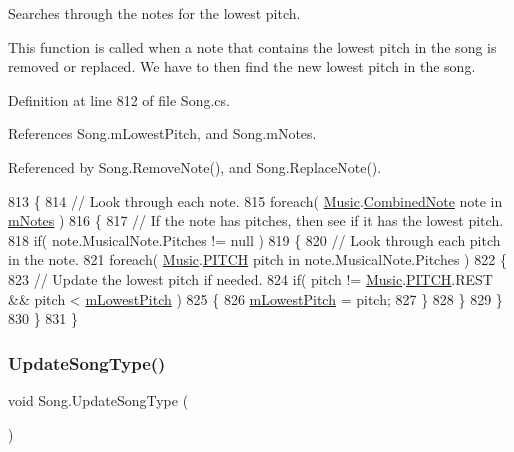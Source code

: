 Searches through the notes for the lowest pitch. 

This function is called when a note that contains the lowest pitch in the song is removed or replaced. We have to then find the new lowest pitch in the song. 

Definition at line 812 of file Song.\+cs.



References Song.\+m\+Lowest\+Pitch, and Song.\+m\+Notes.



Referenced by Song.\+Remove\+Note(), and Song.\+Replace\+Note().


\begin{DoxyCode}
813     \{
814         \textcolor{comment}{// Look through each note.}
815         \textcolor{keywordflow}{foreach}( \hyperlink{class_music}{Music}.\hyperlink{group___music_structs_struct_music_1_1_combined_note}{CombinedNote} note in \hyperlink{group___song_priv_var_ga674bc904a1f856d485d5fb7fe84bac85}{mNotes} )
816         \{
817             \textcolor{comment}{// If the note has pitches, then see if it has the lowest pitch.}
818             \textcolor{keywordflow}{if}( note.MusicalNote.Pitches != null )
819             \{
820                 \textcolor{comment}{// Look through each pitch in the note.}
821                 \textcolor{keywordflow}{foreach}( \hyperlink{class_music}{Music}.\hyperlink{group___music_enums_ga508f69b199ea518f935486c990edac1d}{PITCH} pitch in note.MusicalNote.Pitches )
822                 \{
823                     \textcolor{comment}{// Update the lowest pitch if needed.}
824                     \textcolor{keywordflow}{if}( pitch != \hyperlink{class_music}{Music}.\hyperlink{group___music_enums_ga508f69b199ea518f935486c990edac1d}{PITCH}.REST && pitch < 
      \hyperlink{group___song_priv_var_ga293976ef4c2050687a81edfbf77b4fc1}{mLowestPitch} )
825                     \{
826                         \hyperlink{group___song_priv_var_ga293976ef4c2050687a81edfbf77b4fc1}{mLowestPitch} = pitch;
827                     \}
828                 \}
829             \}
830         \}
831     \}
\end{DoxyCode}
\mbox{\label{group___song_priv_func_ga9a1d6eba1576c3631d3c0331196d9ae2}} 
\subsubsection{\texorpdfstring{Update\+Song\+Type()}{UpdateSongType()}}
{\footnotesize\ttfamily void Song.\+Update\+Song\+Type (\begin{DoxyParamCaption}{ }\end{DoxyParamCaption})\hspace{0.3cm}{\ttfamily [private]}}



